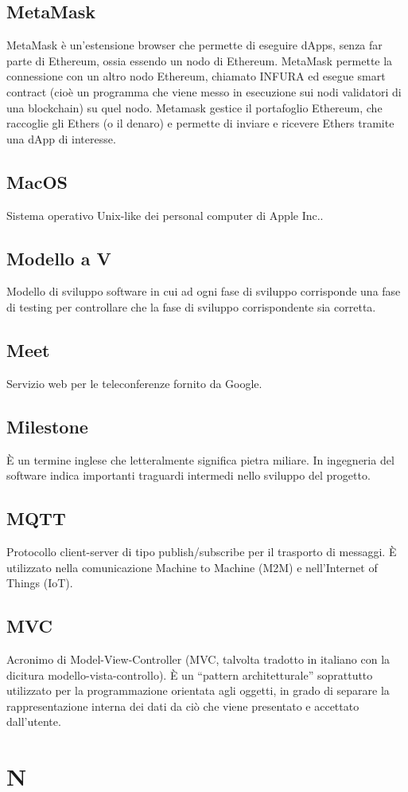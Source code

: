 \subsection{MetaMask} MetaMask è un'estensione browser che permette di eseguire dApps, senza far parte di Ethereum, ossia essendo un nodo di Ethereum. MetaMask permette la connessione con un altro nodo Ethereum, chiamato INFURA ed esegue smart contract (cioè un programma che viene messo in esecuzione sui nodi validatori di una blockchain) su quel nodo. Metamask gestice il portafoglio Ethereum, che raccoglie gli Ethers (o il denaro) e permette di inviare e ricevere Ethers tramite una dApp di interesse.
\subsection{MacOS} Sistema operativo Unix-like dei personal computer di Apple Inc..
\subsection{Modello a V} Modello di sviluppo software in cui ad ogni fase di sviluppo corrisponde una fase di testing per controllare che la fase di sviluppo corrispondente sia corretta.
\subsection{Meet} Servizio web per le teleconferenze fornito da Google.
\subsection{Milestone} È un termine inglese che letteralmente significa pietra miliare. In ingegneria del software indica importanti traguardi intermedi nello sviluppo del progetto.
\subsection{MQTT} Protocollo client-server di tipo publish/subscribe per il trasporto di messaggi. È utilizzato nella comunicazione Machine to Machine (M2M) e nell'Internet of Things (IoT).
\subsection{MVC} Acronimo di Model-View-Controller (MVC, talvolta tradotto in italiano con la dicitura modello-vista-controllo). È un “pattern architetturale”  soprattutto utilizzato per la programmazione orientata agli oggetti, in grado di separare la rappresentazione interna dei dati da ciò che viene presentato e accettato dall'utente.
\newpage \section{N}
